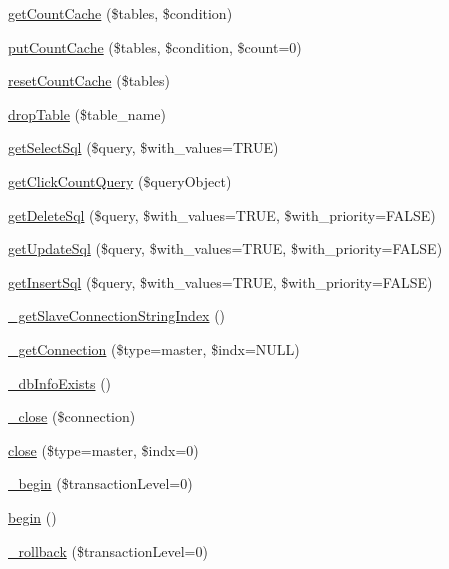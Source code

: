 \begin{DoxyCompactItemize}
\item 
\hyperlink{classDB_af638cf3ae9ad406810b2f8c2d322225c}{get\+Count\+Cache} (\$tables, \$condition)
\item 
\hyperlink{classDB_a90771d4eaa0ff60a1ddbeb338f2ab801}{put\+Count\+Cache} (\$tables, \$condition, \$count=0)
\item 
\hyperlink{classDB_a8167fd227a1955f8300c0d0e70dd9d9e}{reset\+Count\+Cache} (\$tables)
\item 
\hyperlink{classDB_a63a3a5bdc8e30e1cee37cefddd5ce8de}{drop\+Table} (\$table\+\_\+name)
\item 
\hyperlink{classDB_a5324aefa22399846c6a7fb8afeb6e55d}{get\+Select\+Sql} (\$query, \$with\+\_\+values=T\+R\+UE)
\item 
\hyperlink{classDB_a75a6b61801ef6ed2bbf092f1333a8ccd}{get\+Click\+Count\+Query} (\$query\+Object)
\item 
\hyperlink{classDB_aeb58bf0e323895cdc7eda34f09254ed6}{get\+Delete\+Sql} (\$query, \$with\+\_\+values=T\+R\+UE, \$with\+\_\+priority=F\+A\+L\+SE)
\item 
\hyperlink{classDB_ac467d003673def17f4d397e3f25bcf84}{get\+Update\+Sql} (\$query, \$with\+\_\+values=T\+R\+UE, \$with\+\_\+priority=F\+A\+L\+SE)
\item 
\hyperlink{classDB_a2664c0b5ba2bc70d02504ebf343e913e}{get\+Insert\+Sql} (\$query, \$with\+\_\+values=T\+R\+UE, \$with\+\_\+priority=F\+A\+L\+SE)
\item 
\hyperlink{classDB_a8dc4e826557c3de0d49adf7e6112bfea}{\+\_\+get\+Slave\+Connection\+String\+Index} ()
\item 
\hyperlink{classDB_a35bcffded308796495f012f305dea154}{\+\_\+get\+Connection} (\$type=\textquotesingle{}master\textquotesingle{}, \$indx=N\+U\+LL)
\item 
\hyperlink{classDB_a3bbfb0e7579e8d6fc27a20c1219bb693}{\+\_\+db\+Info\+Exists} ()
\item 
\hyperlink{classDB_a8c161612a558f47fb008dec4b46ee05c}{\+\_\+close} (\$connection)
\item 
\hyperlink{classDB_a47c271cf8c3ae31e3b5877184b50cf3a}{close} (\$type=\textquotesingle{}master\textquotesingle{}, \$indx=0)
\item 
\hyperlink{classDB_a3f032a017eee272090ea1ae5dba803e3}{\+\_\+begin} (\$transaction\+Level=0)
\item 
\hyperlink{classDB_a41aea6b3a6787467fcfd16d28a302c54}{begin} ()
\item 
\hyperlink{classDB_a5e766ca5cd5fc8dd24795b0846a8b89f}{\+\_\+rollback} (\$transaction\+Level=0)

\end{DoxyCompactItemize}
